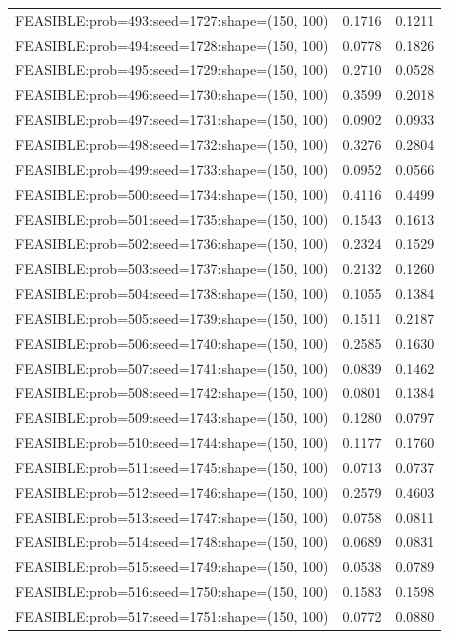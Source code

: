 \begin{longtable}{lcc}
FEASIBLE:prob=493:seed=1727:shape=(150, 100) &   0.1716 & 0.1211 \\
FEASIBLE:prob=494:seed=1728:shape=(150, 100) &   0.0778 & 0.1826 \\
FEASIBLE:prob=495:seed=1729:shape=(150, 100) &   0.2710 & 0.0528 \\
FEASIBLE:prob=496:seed=1730:shape=(150, 100) &   0.3599 & 0.2018 \\
FEASIBLE:prob=497:seed=1731:shape=(150, 100) &   0.0902 & 0.0933 \\
FEASIBLE:prob=498:seed=1732:shape=(150, 100) &   0.3276 & 0.2804 \\
FEASIBLE:prob=499:seed=1733:shape=(150, 100) &   0.0952 & 0.0566 \\
FEASIBLE:prob=500:seed=1734:shape=(150, 100) &   0.4116 & 0.4499 \\
FEASIBLE:prob=501:seed=1735:shape=(150, 100) &   0.1543 & 0.1613 \\
FEASIBLE:prob=502:seed=1736:shape=(150, 100) &   0.2324 & 0.1529 \\
FEASIBLE:prob=503:seed=1737:shape=(150, 100) &   0.2132 & 0.1260 \\
FEASIBLE:prob=504:seed=1738:shape=(150, 100) &   0.1055 & 0.1384 \\
FEASIBLE:prob=505:seed=1739:shape=(150, 100) &   0.1511 & 0.2187 \\
FEASIBLE:prob=506:seed=1740:shape=(150, 100) &   0.2585 & 0.1630 \\
FEASIBLE:prob=507:seed=1741:shape=(150, 100) &   0.0839 & 0.1462 \\
FEASIBLE:prob=508:seed=1742:shape=(150, 100) &   0.0801 & 0.1384 \\
FEASIBLE:prob=509:seed=1743:shape=(150, 100) &   0.1280 & 0.0797 \\
FEASIBLE:prob=510:seed=1744:shape=(150, 100) &   0.1177 & 0.1760 \\
FEASIBLE:prob=511:seed=1745:shape=(150, 100) &   0.0713 & 0.0737 \\
FEASIBLE:prob=512:seed=1746:shape=(150, 100) &   0.2579 & 0.4603 \\
FEASIBLE:prob=513:seed=1747:shape=(150, 100) &   0.0758 & 0.0811 \\
FEASIBLE:prob=514:seed=1748:shape=(150, 100) &   0.0689 & 0.0831 \\
FEASIBLE:prob=515:seed=1749:shape=(150, 100) &   0.0538 & 0.0789 \\
FEASIBLE:prob=516:seed=1750:shape=(150, 100) &   0.1583 & 0.1598 \\
FEASIBLE:prob=517:seed=1751:shape=(150, 100) &   0.0772 & 0.0880 \\

\end{longtable}
